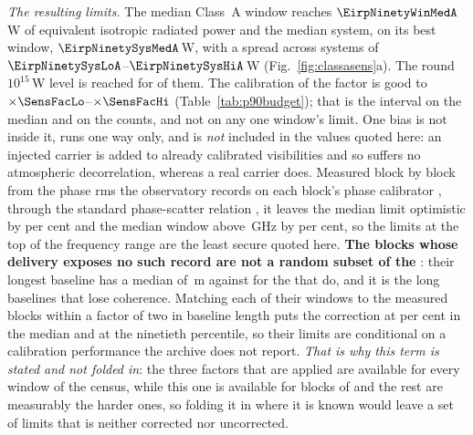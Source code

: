 \emph{The resulting limits.} The median Class~A window reaches
$\EirpNinetyWinMedA$\,W of equivalent isotropic radiated power and the median
system, on its best window, $\EirpNinetySysMedA$\,W, with a spread across
systems of $\EirpNinetySysLoA$--$\EirpNinetySysHiA$\,W
(Fig.~\ref{fig:classasens}a). The round $10^{15}$\,W level is reached for
\NSysEfifteen{} of them. The calibration of the factor is good to
$\times\SensFacLo$--$\times\SensFacHi$ (Table~\ref{tab:p90budget}); that is
the interval on the median and on the counts, and not on any one window's
limit. One bias is not inside it, runs one way only, and is \emph{not}
included in the values quoted here: an injected carrier is
added to already calibrated visibilities and so suffers no atmospheric
decorrelation, whereas a real carrier does. Measured block by block from the
phase rms the observatory records on each block's phase calibrator
\citep[\S\S10.4.11, 11.3.1]{ALMAHandbook}, through the standard phase-scatter relation
\citep[Eq.~3]{Richards2022}, it leaves the median limit optimistic by
\SensDecorPct{} per cent and the median window above \SensDecorHiGHz{}\,GHz by
\SensDecorHiPct{} per cent, so the limits at the top of the frequency range
are the least secure quoted here. \textbf{The \RpDecNUn{} blocks whose
delivery exposes no such record are not a random subset of the
\SensDecorNBlkTot}: their longest baseline has a median of \RpDecBlUn\,m
against \RpDecBlMeas{} for the \SensDecorNBlk{} that do, and it is the long
baselines that lose coherence. Matching each of their windows to the measured
blocks within a factor of two in baseline length puts the correction at
\RpDecMatchMed{} per cent in the median and \RpDecMatchHi{} at the ninetieth
percentile, so their limits are conditional on a calibration performance the
archive does not report. \emph{That is why this term is stated and not
folded in}: the three factors that are applied are available for every window
of the census, while this one is available for \SensDecorNBlk{} blocks of
\SensDecorNBlkTot{} and the rest are measurably the harder ones, so folding
it in where it is known would leave a set of limits that is neither corrected
nor uncorrected.

